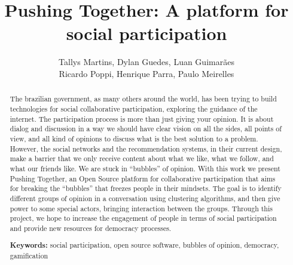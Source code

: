 \documentclass{llncs}
\begin{document}
\sloppy
\title{Pushing Together: A platform for social participation}

\author{Tallys Martins, Dylan Guedes, Luan Guimarães\\
        Ricardo Poppi, Henrique Parra, Paulo Meirelles}

  

\maketitle
\begin{abstract}
  The brazilian government, as many others around the world, has been trying to
  build technologies for social collaborative participation, exploring
  the guidance of the internet.
  The participation process is more than just giving your opinion. It is
  about dialog and discussion in a way we should have clear vision on all the sides,
  all points of view, and all kind of opinions to discuss what is the best solution
  to a problem. However, the social networks and the recommendation systems, in their
  current design, make a barrier that we only receive content about
  what we like, what we follow, and what our friends like. We are 
  stuck in ``bubbles'' of opinion.
  With this work we present Pushing Together, an Open Source platform
  for collaborative participation that aims for breaking the ``bubbles'' that
  freezes people in their mindsets. The goal is to identify different groups of
  opinion in a conversation using clustering algorithms, and then give power to some
  special actors, bringing interaction between the groups.
  Through this project, we hope to increase the engagement of people in terms of
  social participation and provide new resources for democracy processes.

\textbf{Keywords:} social participation, open source software, bubbles of opinion, democracy, gamification
\end{abstract}
\end{document}
